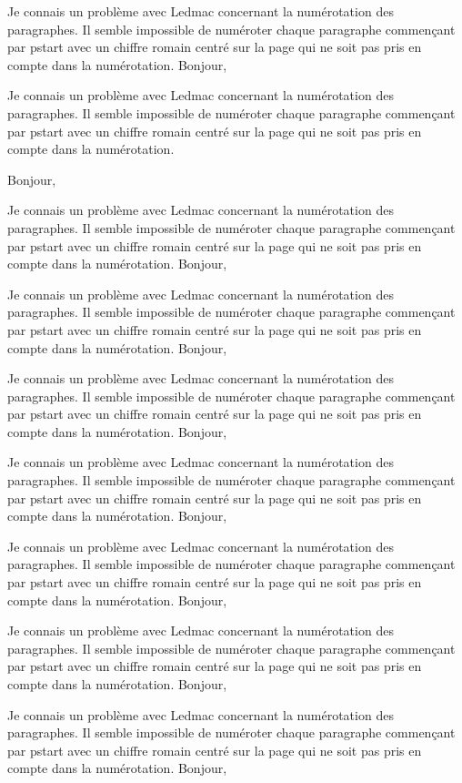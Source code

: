 \documentclass{article}
\begin{document}
Je connais un problème avec Ledmac concernant la numérotation des paragraphes. Il semble impossible de numéroter chaque paragraphe commençant par pstart avec un chiffre romain centré sur la page qui ne soit pas pris en compte dans la numérotation.\pend
\pstart Bonjour,

Je connais un problème avec Ledmac concernant la numérotation des paragraphes. Il semble impossible de numéroter chaque paragraphe commençant par pstart avec un chiffre romain centré sur la page qui ne soit pas pris en compte dans la numérotation.\pend

\pstart Bonjour,

Je connais un problème avec Ledmac concernant la numérotation des paragraphes. Il semble impossible de numéroter chaque paragraphe commençant par pstart avec un chiffre romain centré sur la page qui ne soit pas pris en compte dans la numérotation.\pend
\pstart Bonjour,

Je connais un problème avec Ledmac concernant la numérotation des paragraphes. Il semble impossible de numéroter chaque paragraphe commençant par pstart avec un chiffre romain centré sur la page qui ne soit pas pris en compte dans la numérotation.\pend
\pstart Bonjour,

Je connais un problème avec Ledmac concernant la numérotation des paragraphes. Il semble impossible de numéroter chaque paragraphe commençant par pstart avec un chiffre romain centré sur la page qui ne soit pas pris en compte dans la numérotation.\pend
\pstart Bonjour,

Je connais un problème avec Ledmac concernant la numérotation des paragraphes. Il semble impossible de numéroter chaque paragraphe commençant par pstart avec un chiffre romain centré sur la page qui ne soit pas pris en compte dans la numérotation.\pend
\pstart Bonjour,

Je connais un problème avec Ledmac concernant la numérotation des paragraphes. Il semble impossible de numéroter chaque paragraphe commençant par pstart avec un chiffre romain centré sur la page qui ne soit pas pris en compte dans la numérotation.\pend
\pstart Bonjour,

Je connais un problème avec Ledmac concernant la numérotation des paragraphes. Il semble impossible de numéroter chaque paragraphe commençant par pstart avec un chiffre romain centré sur la page qui ne soit pas pris en compte dans la numérotation.\pend
\pstart Bonjour,

Je connais un problème avec Ledmac concernant la numérotation des paragraphes. Il semble impossible de numéroter chaque paragraphe commençant par pstart avec un chiffre romain centré sur la page qui ne soit pas pris en compte dans la numérotation.\pend
\pstart Bonjour,
\end{document}

